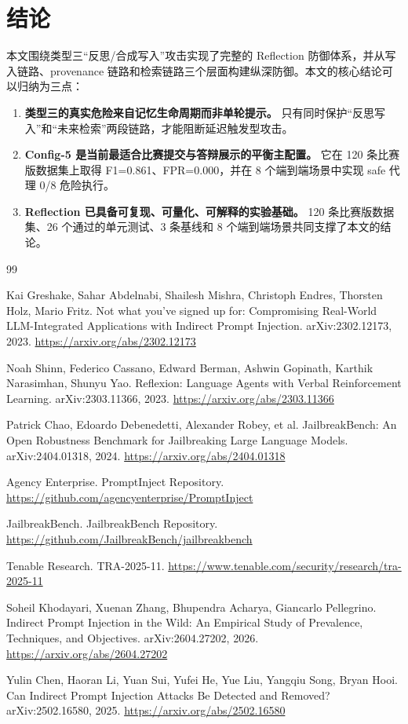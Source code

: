 \documentclass[11pt,a4paper]{ctexart}
\begin{document}
\section{结论}
本文围绕类型三“反思/合成写入”攻击实现了完整的 Reflection 防御体系，并从写入链路、provenance 链路和检索链路三个层面构建纵深防御。本文的核心结论可以归纳为三点：
\begin{enumerate}[leftmargin=2em]
  \item \textbf{类型三的真实危险来自记忆生命周期而非单轮提示。} 只有同时保护“反思写入”和“未来检索”两段链路，才能阻断延迟触发型攻击。
  \item \textbf{Config-5 是当前最适合比赛提交与答辩展示的平衡主配置。} 它在 120 条比赛版数据集上取得 F1=0.861、FPR=0.000，并在 8 个端到端场景中实现 safe 代理 0/8 危险执行。
  \item \textbf{Reflection 已具备可复现、可量化、可解释的实验基础。} 120 条比赛版数据集、26 个通过的单元测试、3 条基线和 8 个端到端场景共同支撑了本文的结论。
\end{enumerate}

\begin{thebibliography}{99}

Kai Greshake, Sahar Abdelnabi, Shailesh Mishra, Christoph Endres, Thorsten Holz, Mario Fritz.
\newblock Not what you've signed up for: Compromising Real-World LLM-Integrated Applications with Indirect Prompt Injection.
\newblock arXiv:2302.12173, 2023.
\newblock \url{https://arxiv.org/abs/2302.12173}

Noah Shinn, Federico Cassano, Edward Berman, Ashwin Gopinath, Karthik Narasimhan, Shunyu Yao.
\newblock Reflexion: Language Agents with Verbal Reinforcement Learning.
\newblock arXiv:2303.11366, 2023.
\newblock \url{https://arxiv.org/abs/2303.11366}

Patrick Chao, Edoardo Debenedetti, Alexander Robey, et al.
\newblock JailbreakBench: An Open Robustness Benchmark for Jailbreaking Large Language Models.
\newblock arXiv:2404.01318, 2024.
\newblock \url{https://arxiv.org/abs/2404.01318}

Agency Enterprise.
\newblock PromptInject Repository.
\newblock \url{https://github.com/agencyenterprise/PromptInject}

JailbreakBench.
\newblock JailbreakBench Repository.
\newblock \url{https://github.com/JailbreakBench/jailbreakbench}

Tenable Research.
\newblock TRA-2025-11.
\newblock \url{https://www.tenable.com/security/research/tra-2025-11}

Soheil Khodayari, Xuenan Zhang, Bhupendra Acharya, Giancarlo Pellegrino.
\newblock Indirect Prompt Injection in the Wild: An Empirical Study of Prevalence, Techniques, and Objectives.
\newblock arXiv:2604.27202, 2026.
\newblock \url{https://arxiv.org/abs/2604.27202}

Yulin Chen, Haoran Li, Yuan Sui, Yufei He, Yue Liu, Yangqiu Song, Bryan Hooi.
\newblock Can Indirect Prompt Injection Attacks Be Detected and Removed?
\newblock arXiv:2502.16580, 2025.
\newblock \url{https://arxiv.org/abs/2502.16580}

\end{thebibliography}
\end{document}
